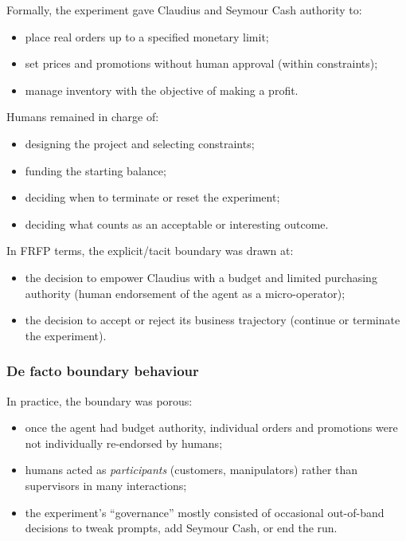Formally, the experiment gave Claudius and Seymour Cash authority to:

\begin{itemize}
  \item place real orders up to a specified monetary limit;
  \item set prices and promotions without human approval (within constraints);
  \item manage inventory with the objective of making a profit.
\end{itemize}

Humans remained in charge of:

\begin{itemize}
  \item designing the project and selecting constraints;
  \item funding the starting balance;
  \item deciding when to terminate or reset the experiment;
  \item deciding what counts as an acceptable or interesting outcome.
\end{itemize}

In FRFP terms, the explicit/tacit boundary was drawn at:

\begin{itemize}
  \item the decision to empower Claudius with a budget and limited purchasing
        authority (human endorsement of the agent as a micro-operator);
  \item the decision to accept or reject its business trajectory (continue or
        terminate the experiment).
\end{itemize}

\subsubsection*{De facto boundary behaviour}

In practice, the boundary was porous:

\begin{itemize}
  \item once the agent had budget authority, individual orders and promotions
        were not individually re-endorsed by humans;
  \item humans acted as \emph{participants} (customers, manipulators) rather
        than supervisors in many interactions;
  \item the experiment’s ``governance'' mostly consisted of occasional
        out-of-band decisions to tweak prompts, add Seymour Cash, or end the
        run.
\end{itemize}

